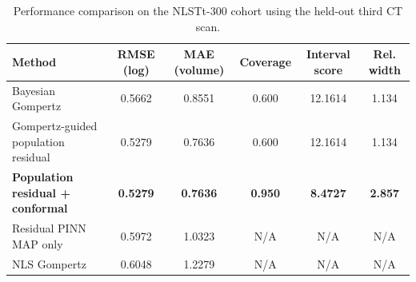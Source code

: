 \begin{table}[t]
\centering
\caption{Performance comparison on the NLSTt-300 cohort using the held-out third CT scan.}
\label{tab:nlstt_population_residual}
\begin{tabular}{lccccc}
\toprule
Method & RMSE (log) & MAE (volume) & Coverage & Interval score & Rel. width \\
\midrule
Bayesian Gompertz & 0.5662 & 0.8551 & 0.600 & 12.1614 & 1.134 \\
Gompertz-guided population residual & 0.5279 & 0.7636 & 0.600 & 12.1614 & 1.134 \\
\textbf{Population residual + conformal} & \textbf{0.5279} & \textbf{0.7636} & \textbf{0.950} & \textbf{8.4727} & \textbf{2.857} \\
Residual PINN MAP only & 0.5972 & 1.0323 & N/A & N/A & N/A \\
NLS Gompertz & 0.6048 & 1.2279 & N/A & N/A & N/A \\
\bottomrule
\end{tabular}
\end{table}
